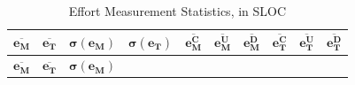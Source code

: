 \begin{xltabular}{\linewidth}[b!]{@{}llllllllll@{}}
\caption[Effort Measurement Statistics]{\label{tbl:rewamp-effortresults}Effort Measurement Statistics, in SLOC}\tabularnewline
\toprule
\begin{minipage}[b]{0.05\columnwidth}\raggedright
\(\bm{\overline{e_M}}\)\strut
\end{minipage} & \begin{minipage}[b]{0.05\columnwidth}\raggedright
\(\bm{\overline{e_T}}\)\strut
\end{minipage} & \begin{minipage}[b]{0.09\columnwidth}\raggedright
\(\bm{\sigma(e_M)}\)\strut
\end{minipage} & \begin{minipage}[b]{0.09\columnwidth}\raggedright
\(\bm{\sigma(e_T)}\)\strut
\end{minipage} & \begin{minipage}[b]{0.05\columnwidth}\raggedright
\(\bm{\overline{e_M^C}}\)\strut
\end{minipage} & \begin{minipage}[b]{0.05\columnwidth}\raggedright
\(\bm{\overline{e_M^U}}\)\strut
\end{minipage} & \begin{minipage}[b]{0.05\columnwidth}\raggedright
\(\bm{\overline{e_M^D}}\)\strut
\end{minipage} & \begin{minipage}[b]{0.05\columnwidth}\raggedright
\(\bm{\overline{e_T^C}}\)\strut
\end{minipage} & \begin{minipage}[b]{0.05\columnwidth}\raggedright
\(\bm{\overline{e_T^U}}\)\strut
\end{minipage} & \begin{minipage}[b]{0.05\columnwidth}\raggedright
\(\bm{\overline{e_T^D}}\)\strut
\end{minipage}\tabularnewline
\midrule
\endfirsthead
\toprule
\begin{minipage}[b]{0.05\columnwidth}\raggedright
\(\bm{\overline{e_M}}\)\strut
\end{minipage} & \begin{minipage}[b]{0.05\columnwidth}\raggedright
\(\bm{\overline{e_T}}\)\strut
\end{minipage} & \begin{minipage}[b]{0.09\columnwidth}\raggedright
\(\bm{\sigma(e_M)}\)\strut
\end{minipage} & \begin{minipage}[b]{0.09\columnwidth}\raggedright

\end{minipage}
\end{xltabular}

